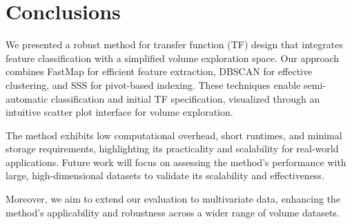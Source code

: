 \section{Conclusions}
\label{sect:conclusions}

We presented a robust method for transfer function (TF) design that integrates feature classification with a simplified volume exploration space. Our approach combines FastMap for efficient feature extraction, DBSCAN for effective clustering, and SSS for pivot-based indexing. These techniques enable semi-automatic classification and initial TF specification, visualized through an intuitive scatter plot interface for volume exploration.

The method exhibits low computational overhead, short runtimes, and minimal storage requirements, highlighting its practicality and scalability for real-world applications. Future work will focus on assessing the method’s performance with large, high-dimensional datasets to validate its scalability and effectiveness.

Moreover, we aim to extend our evaluation to multivariate data, enhancing the method’s applicability and robustness across a wider range of volume datasets.
